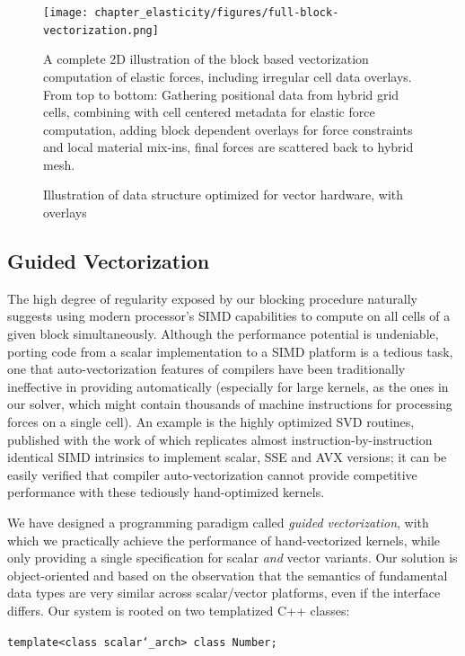 \begin{figure}[t]
   \texttt{[image: chapter\_elasticity/figures/full-block-vectorization.png]}
   \vspace*{-.3in}
   \caption{Illustration of data structure optimized for vector
     hardware, with overlays}{A complete 2D illustration of the block
     based vectorization computation of elastic forces, including
     irregular cell data overlays. From top to bottom: Gathering
     positional data from hybrid grid cells, combining with cell
     centered metadata for elastic force computation, adding block
     dependent overlays for force constraints and local material
     mix-ins, final forces are scattered back to hybrid mesh.}
   \label{fig:full-block-vectorization}
   \vspace*{-.15in}
\end{figure}


\subsection{Guided Vectorization}

The high degree of regularity exposed by our blocking procedure
naturally suggests using modern processor's SIMD capabilities to
compute on all cells of a given block simultaneously. Although the
performance potential is undeniable, porting code from a scalar
implementation to a SIMD platform is a tedious task, one that
auto-vectorization features of compilers have been traditionally
ineffective in providing automatically (especially for
large kernels, as the ones in our solver, which might contain
thousands of machine instructions for processing forces on a
single cell). An example is the highly optimized SVD routines,
published with the work of \citet{McAdaZSETTS:2011} which replicates almost
instruction-by-instruction identical SIMD intrinsics to implement
scalar, SSE and AVX versions; it can be easily verified that
compiler auto-vectorization cannot provide competitive performance
with these tediously hand-optimized kernels.

We have designed a programming paradigm called \emph{guided
  vectorization}, with which we practically achieve the performance of
hand-vectorized kernels, while only providing a single specification
for scalar \emph{and} vector variants. Our solution is object-oriented
and based on the observation that the semantics of fundamental data
types are very similar across scalar/vector platforms, even if the
interface differs. Our system is rooted on two templatized C++
classes:
\begin{shaded}
\texttt{template<class scalar\char`_arch> class Number;}
\end{shaded}


